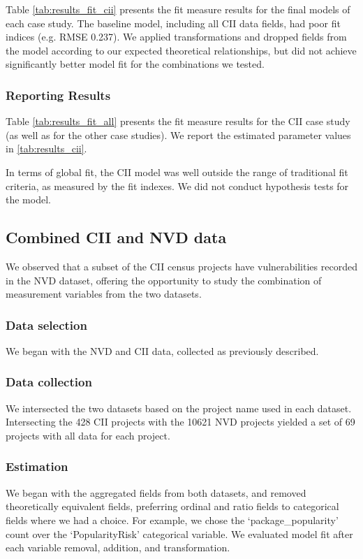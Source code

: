 Table \ref{tab:results_fit_cii} presents the fit measure results for the final models of each case study. The baseline model, including all CII data fields, had poor fit indices (e.g. RMSE 0.237). We applied transformations and dropped fields from the model according to our expected theoretical relationships, but did not achieve significantly better model fit for the combinations we tested.

\subsubsection{Reporting Results}
Table \ref{tab:results_fit_all} presents the fit measure results for the CII case study (as well as for the other case studies). We report the estimated parameter values in \ref{tab:results_cii}.

In terms of global fit, the CII model was well outside the range of traditional fit criteria, as measured by the fit indexes. We did not conduct hypothesis tests for the model. 

\subsection{Combined CII and NVD data}
We observed that a subset of the CII census projects have vulnerabilities recorded in the NVD dataset, offering the opportunity to study the combination of measurement variables from the two datasets.  

\subsubsection{Data selection}
We began with the NVD and CII data, collected as previously described. 

\subsubsection{Data collection}
We intersected the two datasets based on the project name used in each dataset. Intersecting the 428 CII projects with the 10621 NVD projects yielded a set of 69 projects with all data for each project.

\subsubsection{Estimation}
We began with the aggregated fields from both datasets, and removed theoretically equivalent fields, preferring ordinal and ratio fields to categorical fields where we had a choice. For example, we chose the `package\_popularity' count over the `PopularityRisk' categorical variable. We evaluated model fit after each variable removal, addition, and transformation.

